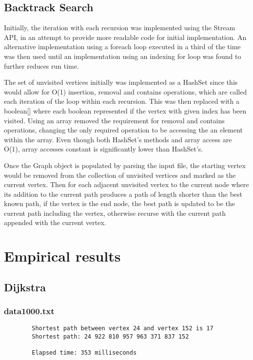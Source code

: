 \documentclass{article}
\begin{document}
    \subsection*{Backtrack Search}

    Initially, the iteration with each recursion was implemented using the Stream API, in an attempt to provide more
    readable code for initial implementation.
    An alternative implementation using a foreach loop executed in a third of the time was then used until an
    implementation using an indexing for loop was found to further reduces run time.

    The set of unvisited vertices initially was implemented as a HashSet since this would allow for O(1)
    insertion, removal and contains operations, which are called each iteration of the loop within each recursion.
    This was then replaced with a boolean[] where each boolean represented if the vertex with given index has been
    visited.
    Using an array removed the requirement for removal and contains operations, changing the only required operation to
    be accessing the an element within the array.
    Even though both HashSet's methods and array access are O(1), array accesses constant is significantly lower than
    HashSet's.

    Once the Graph object is populated by parsing the input file, the starting vertex would be removed from the collection
    of unvisited vertices and marked as the current vertex.
    Then for each adjacent unvisited vertex to the current node where its addition to the current path produces a path of
    length shorter than the best known path, if the vertex is the end node, the best path is updated to be the current path
    including the vertex, otherwise recurse with the current path appended with the current vertex.

    \section*{Empirical results}

    \subsection*{Dijkstra}
    \subsubsection*{data1000.txt}
    \begin{verbatim}
        Shortest path between vertex 24 and vertex 152 is 17
        Shortest path: 24 922 810 957 963 371 837 152

        Elapsed time: 353 milliseconds
    \end{verbatim}
\end{document}
